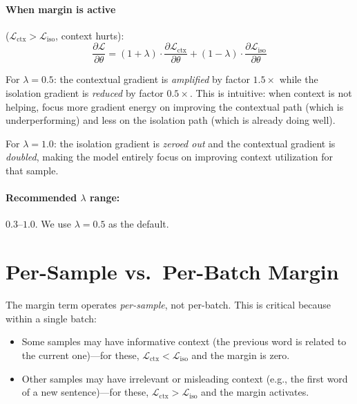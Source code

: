 \documentclass[11pt, a4paper]{report}
\begin{document}
\paragraph{When margin is active} ($\mathcal{L}_{\mathrm{ctx}} > \mathcal{L}_{\mathrm{iso}}$, context hurts):
\begin{equation}
  \frac{\partial \mathcal{L}}{\partial \theta} = (1 + \lambda) \cdot \frac{\partial \mathcal{L}_{\mathrm{ctx}}}{\partial \theta} + (1 - \lambda) \cdot \frac{\partial \mathcal{L}_{\mathrm{iso}}}{\partial \theta}
  \label{eq:gradient-active}
\end{equation}

For $\lambda = 0.5$: the contextual gradient is \emph{amplified} by factor $1.5\times$ while the isolation gradient is \emph{reduced} by factor $0.5\times$. This is intuitive: when context is not helping, focus more gradient energy on improving the contextual path (which is underperforming) and less on the isolation path (which is already doing well).

For $\lambda = 1.0$: the isolation gradient is \emph{zeroed out} and the contextual gradient is \emph{doubled}, making the model entirely focus on improving context utilization for that sample.

\paragraph{Recommended $\lambda$ range:} $0.3$--$1.0$. We use $\lambda = 0.5$ as the default.

\section{Per-Sample vs.\ Per-Batch Margin}
\label{sec:per-sample}

The margin term operates \emph{per-sample}, not per-batch. This is critical because within a single batch:
\begin{itemize}[leftmargin=2em]
  \item Some samples may have informative context (the previous word is related to the current one)---for these, $\mathcal{L}_{\mathrm{ctx}} < \mathcal{L}_{\mathrm{iso}}$ and the margin is zero.
  \item Other samples may have irrelevant or misleading context (e.g., the first word of a new sentence)---for these, $\mathcal{L}_{\mathrm{ctx}} > \mathcal{L}_{\mathrm{iso}}$ and the margin activates.
\end{itemize}
\end{document}
